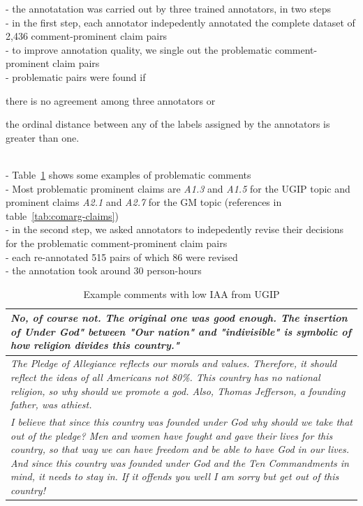 \noindent - the annotatation was carried out by three trained annotators, in two
steps \\
- in the first step, each annotator indepedently annotated the complete dataset of 2,436 comment-prominent claim
pairs \\
- to improve annotation quality, we single out the problematic comment-prominent claim
pairs \\
- problematic pairs were found if 
\begin{enumerate*} 
\item there is no agreement among three annotators or
\item the ordinal distance between any of the labels assigned
by the annotators is greater than one. 
\end{enumerate*} \\
- Table~\ref{tab:problematic-comments} shows some examples of problematic comments \\
- Most problematic prominent claims are \textit{A1.3} and \textit{A1.5} for the UGIP topic
and prominent claims \textit{A2.1} and \textit{A2.7} for the GM topic (references
in table~\ref{tab:comarg-claims}) \\
- in the second step, we asked annotators to indepedently revise 
their decisions for the problematic comment-prominent claim pairs \\
- each re-annotated 515 pairs of which 86 were revised \\
- the annotation took around 30 person-hours \\

\begin{table}
\centering
{\small
\begin{tabular}{@{}p{\columnwidth}@{}}
\toprule
\textit{
\normalsize{%
No, of course not. The original one was good enough.  The insertion of Under
God" between "Our nation" and "indivisible" is symbolic of how religion divides
this country."}
}\\
\midrule
\normalsize{%
\textit{
The Pledge of Allegiance reflects our morals and values. Therefore, it should
reflect the ideas of all Americans not 80\%. This country has no national
religion, so why should we promote a god. Also, Thomas Jefferson, a founding
father, was athiest.
}
}
\\
\midrule
\normalsize{%
\textit{
I believe that since this country was founded under God why should we take that
out of the pledge? Men and women have fought and gave their lives for this
country, so that way we can have freedom and be able to have God in our lives.
And since this country was founded under God and the Ten Commandments in mind,
it needs to stay in. If it offends you well I am sorry but get out of this
country!}
}\\
\bottomrule
\end{tabular}
}
\caption{Example comments with low IAA from UGIP}
\label{tab:problematic-comments}
\end{table}

